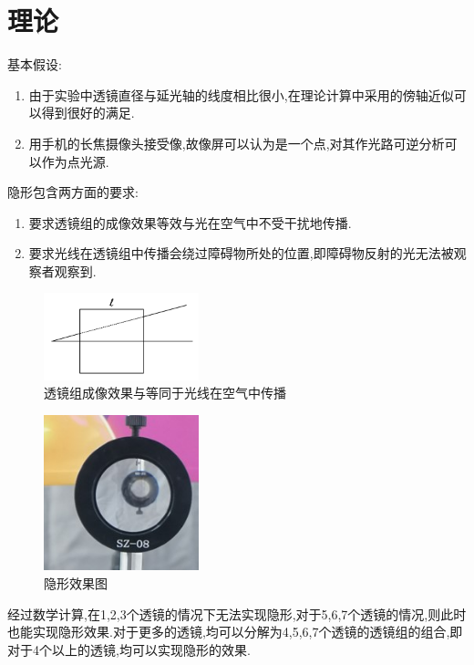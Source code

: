 \documentclass[UTF8]{gapd}
\begin{document}
\section{理论}
基本假设:
\begin{enumerate}
  \item 由于实验中透镜直径与延光轴的线度相比很小,在理论计算中采用的傍轴近似可以得到很好的满足.
  \item 用手机的长焦摄像头接受像,故像屏可以认为是一个点,对其作光路可逆分析可以作为点光源.
\end{enumerate}

隐形包含两方面的要求:
\begin{enumerate}
  \item 要求透镜组的成像效果等效与光在空气中不受干扰地传播.
  \item 要求光线在透镜组中传播会绕过障碍物所处的位置,即障碍物反射的光无法被观察者观察到.
\end{enumerate}
\begin{figure}
  \centering
  \includegraphics[width=0.4\textwidth]{images/2.jpg}
  \caption{透镜组成像效果与等同于光线在空气中传播}
  \label{fig:2}
\end{figure}
\begin{figure}
  \centering
  \includegraphics[width=0.4\textwidth]{images/3.jpg}
  \caption{隐形效果图}
\end{figure}
经过数学计算,在1,2,3个透镜的情况下无法实现隐形,对于5,6,7个透镜的情况,则此时也能实现隐形效果.对于更多的透镜,均可以分解为4,5,6,7个透镜的透镜组的组合,即对于4个以上的透镜,均可以实现隐形的效果.
\end{document}
